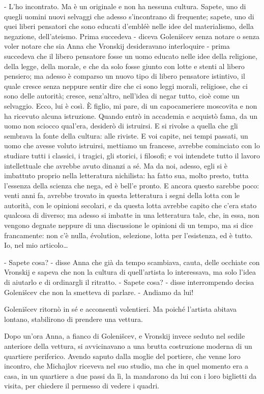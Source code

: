 - L'ho incontrato. Ma è un originale e non ha nessuna cultura. Sapete, uno di quegli uomini nuovi selvaggi che adesso s'incontrano di frequente; sapete, uno di quei liberi pensatori che sono educati d'embléè nelle idee del materialismo, della negazione, dell'ateismo. Prima succedeva - diceva Golenišcev senza notare o senza voler notare che sia Anna che Vronskij desideravano interloquire - prima succedeva che il libero pensatore fosse un uomo educato nelle idee della religione, della legge, della morale, e che da solo fosse giunto con lotte e stenti al libero pensiero; ma adesso è comparso un nuovo tipo di libero pensatore istintivo, il quale cresce senza neppure sentir dire che ci sono leggi morali, religiose, che ci sono delle autorità; cresce, senz'altro, nell'idea di negar tutto, cioè come un selvaggio. Ecco, lui è così. È figlio, mi pare, di un capocameriere moscovita e non ha ricevuto alcuna istruzione. Quando entrò in accademia e acquistò fama, da un uomo non sciocco qual'era, desiderò di istruirsi. E si rivolse a quella che gli sembrava la fonte della cultura: alle riviste. E voi capite, nei tempi passati, un uomo che avesse voluto istruirsi, mettiamo un francese, avrebbe cominciato con lo studiare tutti i classici, i tragici, gli storici, i filosofi; e voi intendete tutto il lavoro intellettuale che avrebbe avuto dinanzi a sé. Ma da noi, adesso, egli si è imbattuto proprio nella letteratura nichilista: ha fatto sua, molto presto, tutta l'essenza della scienza che nega, ed è bell'e pronto. E ancora questo sarebbe poco: venti anni fa, avrebbe trovato in questa letteratura i segni della lotta con le autorità, con le opinioni secolari, e da questa lotta avrebbe capito che c'era stato qualcosa di diverso; ma adesso si imbatte in una letteratura tale, che, in essa, non vengono degnate neppure di una discussione le opinioni di un tempo, ma si dice francamente: non c'è nulla, évolution, selezione, lotta per l'esistenza, ed è tutto. Io, nel mio articolo\ldots{} 

- Sapete cosa? - disse Anna che già da tempo scambiava, cauta, delle occhiate con Vronskij e sapeva che non la cultura di quell'artista lo interessava, ma solo l'idea di aiutarlo e di ordinargli il ritratto. - Sapete cosa? - disse interrompendo decisa Golenišcev che non la smetteva di parlare. - Andiamo da lui! 

Golenišcev ritornò in sé e acconsentì volentieri. Ma poiché l'artista abitava lontano, stabilirono di prendere una vettura. 

Dopo un'ora Anna, a fianco di Golenišcev, e Vronskij invece seduto nel sedile anteriore della vettura, si avvicinavano a una brutta costruzione moderna di un quartiere periferico. Avendo saputo dalla moglie del portiere, che venne loro incontro, che Michajlov riceveva nel suo studio, ma che in quel momento era a casa, in un quartiere a due passi da lì, la mandarono da lui con i loro biglietti da visita, per chiedere il permesso di vedere i quadri. 

